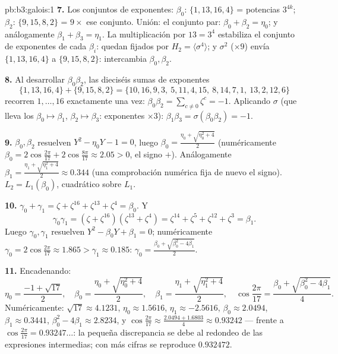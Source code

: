 \begin{solution}{pb:b3:galois:1}
\textbf{7.} Los conjuntos de exponentes: $\beta_0$: $\{1, 13, 16, 4\}$ =
potencias $3^{4k}$; $\beta_2$: $\{9, 15, 8, 2\}$ = $9 \times$ ese
conjunto. Unión: el conjunto par: $\beta_0 + \beta_2 = \eta_0$; y
análogamente $\beta_1 + \beta_3 = \eta_1$. La multiplicación por
$13 = 3^4$ estabiliza el conjunto de exponentes de cada $\beta_i$:
quedan fijados por $H_2 =
\langle\sigma^4\rangle$; y $\sigma^2$ ($\times 9$) envía $\{1,13,16,4\}$
a $\{9, 15, 8, 2\}$: intercambia $\beta_0,
\beta_2$.

\textbf{8.} Al desarrollar $\beta_0\beta_2$, las dieciséis sumas de
exponentes
\[
\{1,13,16,4\} + \{9,15,8,2\} =
\{10,16,9,3,\ 5,11,4,15,\ 8,14,7,1,\ 13,2,12,6\}
\]
recorren $1, \dots, 16$ exactamente una vez: $\beta_0\beta_2 =
\sum_{c\ne0}\zeta^c = -1$. Aplicando $\sigma$ (que lleva los
$\beta_0 \mapsto \beta_1$, $\beta_2 \mapsto \beta_3$:
exponentes $\times 3$): $\beta_1\beta_3 = \sigma(\beta_0\beta_2)
= -1$.

\textbf{9.} $\beta_0, \beta_2$ resuelven $Y^2 - \eta_0 Y - 1 = 0$, luego
$\beta_0 = \frac{\eta_0 + \sqrt{\eta_0^2 + 4}}2$ (numéricamente
$\beta_0 = 2\cos\frac{2\pi}{17} + 2\cos\frac{8\pi}{17} \approx
2.05 > 0$, el signo $+$). Análogamente $\beta_1 = \frac{\eta_1 +
\sqrt{\eta_1^2 + 4}}2 \approx 0.344$ (una comprobación numérica fija de
nuevo el signo). $L_2 = L_1(\beta_0)$, cuadrático sobre $L_1$.

\textbf{10.} $\gamma_0 + \gamma_1 = \zeta + \zeta^{16} +
\zeta^{13} + \zeta^4 = \beta_0$. Y
\[
\gamma_0\gamma_1 = (\zeta + \zeta^{16})(\zeta^{13} + \zeta^4)
= \zeta^{14} + \zeta^{5} + \zeta^{12} + \zeta^{3} = \beta_1 .
\]
Luego $\gamma_0, \gamma_1$ resuelven $Y^2 - \beta_0Y + \beta_1 = 0$;
numéricamente $\gamma_0 = 2\cos\frac{2\pi}{17} \approx 1.865 >
\gamma_1 \approx 0.185$: $\gamma_0 = \frac{\beta_0 +
\sqrt{\beta_0^2 - 4\beta_1}}2$.

\textbf{11.} Encadenando:
\[
\eta_0 = \frac{-1 + \sqrt{17}}2,
\quad
\beta_0 = \frac{\eta_0 + \sqrt{\eta_0^2 + 4}}2,
\quad
\beta_1 = \frac{\eta_1 + \sqrt{\eta_1^2 + 4}}2,
\quad
\cos\frac{2\pi}{17} = \frac{\beta_0 + \sqrt{\beta_0^2 -
4\beta_1}}4 .
\]
Numéricamente: $\sqrt{17} \approx 4.1231$, $\eta_0 \approx
1.5616$, $\eta_1 \approx -2.5616$, $\beta_0 \approx 2.0494$,
$\beta_1 \approx 0.3441$, $\beta_0^2 - 4\beta_1 \approx
2.8234$, y $\cos\frac{2\pi}{17} \approx \frac{2.0494 +
1.6803}4 \approx 0.93242$ --- frente a $\cos\frac{2\pi}{17} =
0.93247\dots$: la pequeña discrepancia se debe al redondeo de las
expresiones intermedias; con más cifras se reproduce
$0.932472$.


\end{solution}
